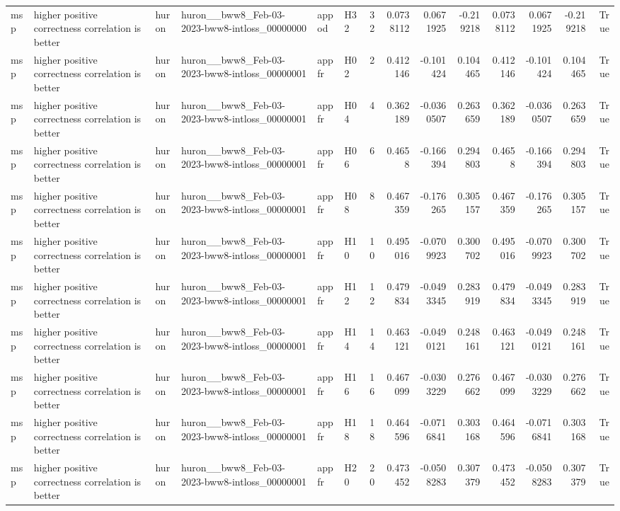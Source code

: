 \begin{longtable}{llllllrrrrrrrr}
msp & higher positive correctness correlation is better & huron & huron\_\_bww8\_Feb-03-2023-bww8-intloss\_00000000 & appod & H32 & 32 & 0.0738112 & 0.0671925 & -0.219218 & 0.0738112 & 0.0671925 & -0.219218 & True \\
msp & higher positive correctness correlation is better & huron & huron\_\_bww8\_Feb-03-2023-bww8-intloss\_00000001 & appfr & H02 & 2 & 0.412146 & -0.101424 & 0.104465 & 0.412146 & -0.101424 & 0.104465 & True \\
msp & higher positive correctness correlation is better & huron & huron\_\_bww8\_Feb-03-2023-bww8-intloss\_00000001 & appfr & H04 & 4 & 0.362189 & -0.0360507 & 0.263659 & 0.362189 & -0.0360507 & 0.263659 & True \\
msp & higher positive correctness correlation is better & huron & huron\_\_bww8\_Feb-03-2023-bww8-intloss\_00000001 & appfr & H06 & 6 & 0.4658 & -0.166394 & 0.294803 & 0.4658 & -0.166394 & 0.294803 & True \\
msp & higher positive correctness correlation is better & huron & huron\_\_bww8\_Feb-03-2023-bww8-intloss\_00000001 & appfr & H08 & 8 & 0.467359 & -0.176265 & 0.305157 & 0.467359 & -0.176265 & 0.305157 & True \\
msp & higher positive correctness correlation is better & huron & huron\_\_bww8\_Feb-03-2023-bww8-intloss\_00000001 & appfr & H10 & 10 & 0.495016 & -0.0709923 & 0.300702 & 0.495016 & -0.0709923 & 0.300702 & True \\
msp & higher positive correctness correlation is better & huron & huron\_\_bww8\_Feb-03-2023-bww8-intloss\_00000001 & appfr & H12 & 12 & 0.479834 & -0.0493345 & 0.283919 & 0.479834 & -0.0493345 & 0.283919 & True \\
msp & higher positive correctness correlation is better & huron & huron\_\_bww8\_Feb-03-2023-bww8-intloss\_00000001 & appfr & H14 & 14 & 0.463121 & -0.0490121 & 0.248161 & 0.463121 & -0.0490121 & 0.248161 & True \\
msp & higher positive correctness correlation is better & huron & huron\_\_bww8\_Feb-03-2023-bww8-intloss\_00000001 & appfr & H16 & 16 & 0.467099 & -0.0303229 & 0.276662 & 0.467099 & -0.0303229 & 0.276662 & True \\
msp & higher positive correctness correlation is better & huron & huron\_\_bww8\_Feb-03-2023-bww8-intloss\_00000001 & appfr & H18 & 18 & 0.464596 & -0.0716841 & 0.303168 & 0.464596 & -0.0716841 & 0.303168 & True \\
msp & higher positive correctness correlation is better & huron & huron\_\_bww8\_Feb-03-2023-bww8-intloss\_00000001 & appfr & H20 & 20 & 0.473452 & -0.0508283 & 0.307379 & 0.473452 & -0.0508283 & 0.307379 & True \\

\end{longtable}
